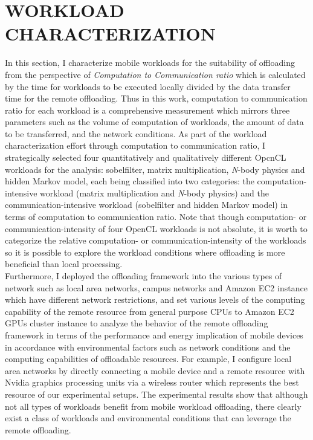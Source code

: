 \chapter{WORKLOAD CHARACTERIZATION}
\label{chap:character}
%
In this section, I characterize mobile workloads for the
suitability of offloading from the perspective of {\it Computation to
Communication ratio} which is calculated by the time for workloads to be
executed locally divided by the data transfer time for the remote
offloading.
%
Thus in this work, computation to communication ratio for each workload is
a comprehensive measurement which mirrors three parameters such as the
volume of computation of workloads, the amount of data to be transferred, and the
network conditions. 
%
As part of the workload characterization effort through computation to
communication ratio, I strategically selected four quantitatively and qualitatively 
different OpcnCL workloads for the analysis:
sobelfilter, matrix multiplication, {\it N}-body physics and hidden
Markov model, each being classified into two categories: 
the computation-intensive workload (matrix multiplication and 
{\it N}-body physics) and the communication-intensive workload 
(sobelfilter and hidden Markov model) in terms of computation to communication ratio.
%
Note that though computation- or communication-intensity of
four OpenCL workloads is not absolute, it is worth to categorize 
the relative computation- or communication-intensity of the workloads so
it is possible to explore the workload conditions where offloading is
more beneficial than local processing.\\    
%
Furthermore, I deployed the offloading framework into the
various types of network such as local area networks, campus networks
and Amazon EC2 instance which have different network restrictions, and
set various levels of the computing capability of the remote
resource from general purpose CPUs to Amazon EC2 GPUs cluster instance to
analyze the behavior of the remote offloading framework in terms of the
performance and energy implication of mobile devices in accordance with
environmental factors such as network conditions and the computing
capabilities of offloadable resources.
%
For example, I configure local area networks by directly connecting a
mobile device and a remote resource with Nvidia graphics processing
units via a wireless router which represents the best resource of our
experimental setups.
%
The experimental results show that although not all types of workloads
benefit from mobile workload offloading, there clearly exist a class of
workloads and environmental conditions that can leverage the remote
offloading.
%
